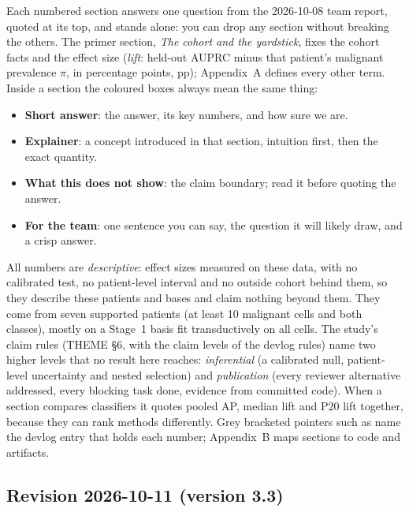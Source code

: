 \documentclass[11pt]{article}
\newcommand{\swatch}[2]{\fcolorbox{#2}{#1}{\rule{0pt}{5pt}\rule{5pt}{0pt}}}
\newcommand{\barswatch}{{\color{inkmuted!55}\rule[-1pt]{2.5pt}{9pt}}\hspace{6.8pt}}
\begin{document}
Each numbered section answers one question from the 2026-10-08 team report, quoted at its top, and stands alone: you can drop any section without breaking the others. The primer section, \emph{The cohort and the yardstick}, fixes the cohort facts and the effect size (\emph{lift}: held-out AUPRC minus that patient's malignant prevalence $\pi$, in percentage points, pp); Appendix~A defines every other term. Inside a section the coloured boxes always mean the same thing:

\begin{itemize}[leftmargin=1.4em]
\item[\swatch{boxtake}{boxtakeedge}] \textbf{Short answer}: the answer, its key numbers, and how sure we are.
\item[\barswatch] \textbf{Explainer}: a concept introduced in that section, intuition first, then the exact quantity.
\item[\swatch{boxcaveat}{boxcaveatedge}] \textbf{What this does not show}: the claim boundary; read it before quoting the answer.
\item[\swatch{boxteam}{boxteamedge}] \textbf{For the team}: one sentence you can say, the question it will likely draw, and a crisp answer.
\end{itemize}

All numbers are \emph{descriptive}: effect sizes measured on these data, with no calibrated test, no patient-level interval and no outside cohort behind them, so they describe these patients and bases and claim nothing beyond them. They come from seven supported patients (at least 10 malignant cells and both classes), mostly on a Stage~1 basis fit transductively on all cells. The study's claim rules (THEME \S6, with the claim levels of the devlog rules) name two higher levels that no result here reaches: \emph{inferential} (a calibrated null, patient-level uncertainty and nested selection) and \emph{publication} (every reviewer alternative addressed, every blocking task done, evidence from committed code). When a section compares classifiers it quotes pooled AP, median lift and P20 lift together, because they can rank methods differently. Grey bracketed pointers such as  name the devlog entry that holds each number; Appendix~B maps sections to code and artifacts.

\subsection*{Revision 2026-10-11 (version 3.3)}
\end{document}
